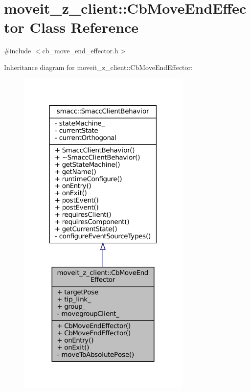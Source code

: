\hypertarget{classmoveit__z__client_1_1CbMoveEndEffector}{}\section{moveit\+\_\+z\+\_\+client\+:\+:Cb\+Move\+End\+Effector Class Reference}
\label{classmoveit__z__client_1_1CbMoveEndEffector}


{\ttfamily \#include $<$cb\+\_\+move\+\_\+end\+\_\+effector.\+h$>$}



Inheritance diagram for moveit\+\_\+z\+\_\+client\+:\+:Cb\+Move\+End\+Effector\+:
\nopagebreak
\begin{figure}[H]
\begin{center}
\leavevmode
\includegraphics[width=244pt]{classmoveit__z__client_1_1CbMoveEndEffector__inherit__graph}
\end{center}
\end{figure}


